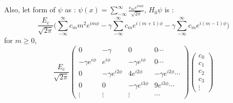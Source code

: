 \documentclass{article}
\begin{document}
Also, let form of $\psi$ as : $\psi(x) = \sum^\infty_{-\infty} \frac{c_m e^{im\phi}}{\sqrt{2\pi}}$, $H_0 \psi$ is :
\begin{equation}
    \frac{E_c}{\sqrt{2\pi}} \bigg(\sum^\infty_{-\infty}c_m m^2 e^{im\phi} - \gamma\sum^\infty_{-\infty}c_m  e^{i(m+1)\phi} - \gamma\sum^\infty_{-\infty}c_m  e^{i(m-1)\phi} \bigg)
\end{equation}
for $m \geq 0$,
\begin{equation}
    \frac{E_c}{\sqrt{2 \pi}}
    \begin{pmatrix}
        0 & -\gamma & 0 & 0 \cdots \\
        -\gamma e^{i\phi} & e^{i\phi} & -\gamma e^{i\phi} & 0 \cdots \\
        0 & -\gamma e^{i2\phi} & 4e^{i2\phi} & -\gamma e^{i2\phi} \cdots \\
        0 & 0 & -\gamma e^{i3\phi} & 9e^{i3\phi} \cdots \\
        \vdots & \vdots & \vdots & \cdots 
    \end{pmatrix}
    \begin{pmatrix}
        c_0 \\ c_1 \\ c_2 \\ c_3  \\ \vdots
    \end{pmatrix}
\end{equation}
\end{document}
